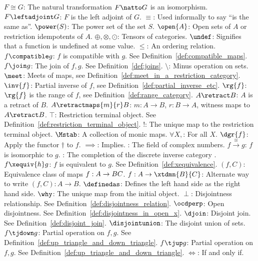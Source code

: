 \begin{tabbing}
\addsymbol \mbox{$F\cong G$}: {The natural transformation $F\natto G$ is an isomorphism.}
\addsymbol \mbox{$F\leftadjoint G$}: {$F$ is the left adjoint of $G$.}
\addsymbol \mbox{$\equiv$}: {Used informally to say ``is the same as''.}
\addsymbol \mbox{$\power(S)$}: {The power set of the set $S$.}
\addsymbol \mbox{$\open{A}$}: {Open sets of $A$ or restriction idempotents of $A$.}
\addsymbol \mbox{$\oplus,\otimes,\odot$}: {Tensors of categories.}
\addsymbol \mbox{$\undef$}: {Signifies that a function is undefined at some value.}
\addsymbol \mbox{$\le$}: {An ordering relation.}
\addsymbol \mbox{$f\compatible g$}: {$f$ is compatible with $g$. See  Definition~\ref{def:compatible_maps}.}
\addsymbol \mbox{$f\join g$}: {The join of $f,g$. See Definition~\ref{def:joins}.}
\addsymbol \mbox{$\setminus$}: {Minus operation on sets.}
\addsymbol \mbox{$\meet$}: {Meets of maps, see Definition~\ref{def:meet_in_a_restriction_category}.}
\addsymbol \mbox{$\inv{f}$}: {Partial inverse of $f$, see Definition~\ref{def:partial_inverse_etc}.}
\addsymbol \mbox{$\rg{f}$}: {$\rg{f}$ is the range of $f$, see Definition~\ref{def:range_category}.}
\addsymbol \mbox{$A\retract B$}: {$A$ is a retract of $B$.}
\addsymbol \mbox{$A\retractmaps{m}{r} B$}: {$m:A\to B$, $r:B\to A$, witness maps to $A\retract B$.}
\addsymbol \mbox{$\top$}: {Restriction terminal object. See  Definition~\ref{def:restriction_terminal_object}.}
\addsymbol \mbox{$!$}: {The unique map to the restriction terminal object.}
\addsymbol \mbox{$\Mstab$}: {A collection of monic maps.}
\addsymbol \mbox{$\forall X,$}: {For all $X$.}
\addsymbol \mbox{$\dgr{f}$}: {Apply the functor $\dagger$ to $f$.}
\addsymbol \mbox{$\implies$}: {Implies.}
\addsymbol \mbox{\complex}: {The field of complex numbers.}
\addsymbol \mbox{$f\xrightarrow{\cong}g$}: {$f$ is isomorphic to $g$.}
\addsymbol \mbox{\Xt}: {The completion of the discrete inverse category \X.}
\addsymbol \mbox{$f\xequiv{h}g$}: {$f$ is equivalent to $g$. See  Definition~\ref{def:xequivalence}.}
\addsymbol \mbox{$(f,C)$}: {Equivalence class of maps $f:A\to B\*C$.}
\addsymbol \mbox{$f:A\to\xtdmn{B}{C}$}: {Alternate way to write $(f,C):A \to B$.}
\addsymbol \mbox{$\definedas$}: {Defines the left hand side as the right hand side.}
\addsymbol \mbox{$\why$}: {The unique map from the initial object.}
\addsymbol \mbox{$\perp$}: {Disjointness relationship. See  Definition~\ref{def:disjointness_relation}.}
\addsymbol \mbox{$\ocdperp$}: {Open disjointness. See Definition~\ref{def:disjointness_in_open_x}.}
\addsymbol \mbox{$\djoin$}: {Disjoint join. See Definition~\ref{def:disjoint_join}.}
\addsymbol \mbox{$\disjointunion$}: {The disjoint union of sets.}
\addsymbol \mbox{$f\tjdown g$}: {Partial operation on $f,g$. See Definition~\ref{def:up_triangle_and_down_triangle}.}
\addsymbol \mbox{$f\tjup g$}: {Partial operation on $f,g$. See Definition~\ref{def:up_triangle_and_down_triangle}.}
\addsymbol \mbox{$\iff$}: {If and only if.}
\end{tabbing}

